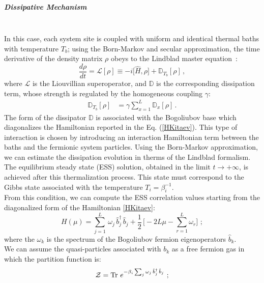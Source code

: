 \documentclass[pra,twocolumn,preprintnumbers,amsmath,amssymb,nofootinbib,floatfix,longbibliography]{revtex4}
\begin{document}
\subparagraph{Dissipative Mechanism}$ $\\
  In this case, each system site is coupled with uniform
  and identical thermal baths with temperature $T_b$; using
  the Born-Markov and secular approximation, the time
  derivative of the density matrix $\rho$ obeys to the
  Lindblad master equation~\cite{BP07}:
  \begin{equation}
    \label{Lindblad}
    \frac{d\rho}{dt} = \mathcal{L}[\rho]\equiv
    -i\bigr[\hat{H},{\rho}\bigr]+\mathbb{D}_{T_b}[\rho]\,,
  \end{equation}
  where $\mathcal{L}$ is the Liouvillian superoperator, and
  $\mathbb{D}$ is the corresponding dissipation term, whose
  strength is regulated by the homogeneous coupling
  $\gamma$:
  \begin{align}
    \label{dissipator}
    \mathbb{D}_{T_b}[\rho]&=
    \gamma \sum_{x=1}^{L}\mathbb{D}_{x}[\rho]\,.
  \end{align}
  The form of the dissipator $\mathbb{D}$ is associated
  with the Bogoliubov base which diagonalizes the
  Hamiltonian reported in the Eq. (\ref{HKitaev}). This
  type of interaction is chosen by introducing an
  interaction Hamiltonian term between the baths and the
  fermionic system particles. Using the Born-Markov
  approximation, we can estimate the dissipation evolution
  in therms of the Lindblad formalism. \\
  The equilibrium steady state (ESS) solution, obtained in
  the limit $t \to +\infty$, is achieved after this
  thermalization process. This state must correspond to the
  Gibbs state associated with the temperature
  $T_i=\beta_i^{-1}$.\\
  From this condition, we can compute the ESS correlation
  values starting from the diagonalized form of the
  Hamiltonian \ref{HKitaev}:
  \begin{equation}
    \label{HKdiag}
    H(\mu)=\sum _{j=1}^L\,\omega _j \,\hat b^\dagger _j\,
    \hat b_j+ \frac{1}{2}\,\Bigr[ -2L\mu - \sum _{r=1}^L
    \omega _r \Bigr] \,\,;
  \end{equation}
  where the $\omega_k$ is the spectrum of the Bogoliubov
  fermion eigenoperators $\hat b_k$.\\
  We can assume the quasi-particles associated with $b_k$
  as a free fermion gas in which the partition function is:
  \begin{equation}
    \label{Partition}
    {\cal Z} = {\rm Tr} \,\, e^{-\beta_i
      \sum_j \omega _j \,\hat b^\dagger _j\, \hat b_j}\,\,;
  \end{equation}
\end{document}
